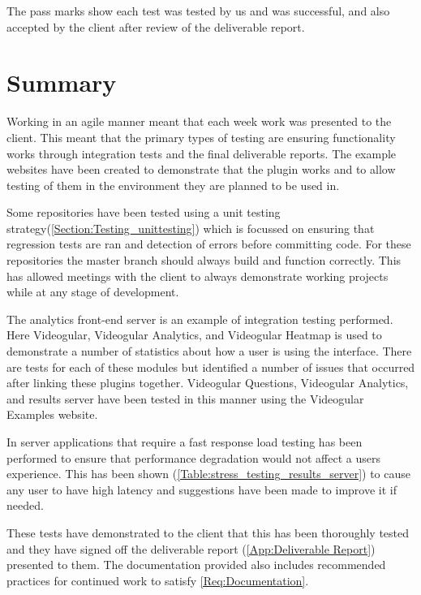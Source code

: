 The pass marks show each test was tested by us and was successful, and also accepted by the client after review of the deliverable report.

\section{Summary}

Working in an agile manner meant that each week work was presented to the client. This meant that the primary types of testing are ensuring functionality works through integration tests and the final deliverable reports. The example websites have been created to demonstrate that the plugin works and to allow testing of them in the environment they are planned to be used in.

Some repositories have been tested using a unit testing strategy(\autoref{Section:Testing_unittesting}) which is focussed on ensuring that regression tests are ran and detection of errors before committing code. For these repositories the master branch should always build and function correctly. This has allowed meetings with the client to always demonstrate working projects while at any stage of development.

The analytics front-end server is an example of integration testing performed. Here \gls{Videogular}, Videogular Analytics, and Videogular Heatmap is used to demonstrate a number of statistics about how a user is using the interface. There are tests for each of these modules but identified a number of issues that occurred after linking these plugins together. Videogular Questions, Videogular Analytics, and results server have been tested in this manner using the Videogular Examples website.

In server applications that require a fast response load testing has been performed to ensure that performance degradation would not affect a users experience. This has been shown (\autoref{Table:stress_testing_results_server}) to cause any user to have high latency and suggestions have been made to improve it if needed.

These tests have demonstrated to the client that this has been thoroughly tested and they have signed off the deliverable report (\cref{App:Deliverable Report}) presented to them. The documentation provided also includes recommended practices for continued work to satisfy \cref{Req:Documentation}.
